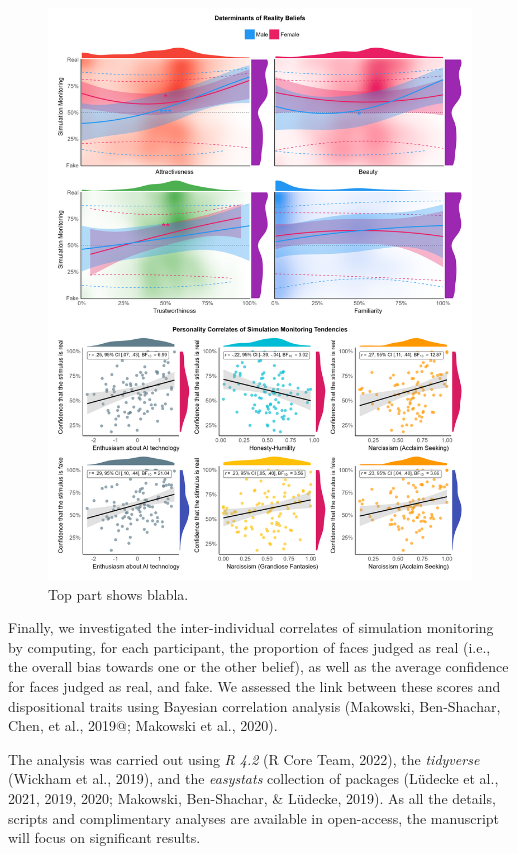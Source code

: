 \documentclass[
  man,floatsintext]{apa6}
\begin{document}
\begin{figure}
\includegraphics[width=1\linewidth]{../figures/Figure2} \caption{Top part shows blabla.}\label{fig:unnamed-chunk-3}
\end{figure}

Finally, we investigated the inter-individual correlates of simulation monitoring by computing, for each participant, the proportion of faces judged as real (i.e., the overall bias towards one or the other belief), as well as the average confidence for faces judged as real, and fake. We assessed the link between these scores and dispositional traits using Bayesian correlation analysis (Makowski, Ben-Shachar, Chen, et al., 2019@; Makowski et al., 2020).

The analysis was carried out using \emph{R 4.2} (R Core Team, 2022), the \emph{tidyverse} (Wickham et al., 2019), and the \emph{easystats} collection of packages (Lüdecke et al., 2021, 2019, 2020; Makowski, Ben-Shachar, \& Lüdecke, 2019). As all the details, scripts and complimentary analyses are available in open-access, the manuscript will focus on significant results.
\end{document}
